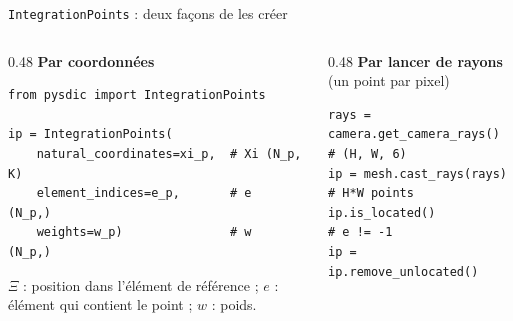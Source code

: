 \documentclass[aspectratio=169,11pt]{beamer}
\begin{document}
\begin{frame}[fragile]{\texttt{IntegrationPoints} : deux façons de les créer}
  \begin{columns}[T]
    \begin{column}{0.48\textwidth}
      \textbf{Par coordonnées}
\begin{lstlisting}
from pysdic import IntegrationPoints
 
ip = IntegrationPoints(
    natural_coordinates=xi_p,  # Xi (N_p, K)
    element_indices=e_p,       # e  (N_p,)
    weights=w_p)               # w  (N_p,)
\end{lstlisting}
      \scriptsize $\Xi$ : position dans l'élément de référence ; $e$ : élément qui
      contient le point ; $w$ : poids.
    \end{column}
    \begin{column}{0.48\textwidth}
      \textbf{Par lancer de rayons} \scriptsize(un point par pixel)
\begin{lstlisting}
rays = camera.get_camera_rays()  # (H, W, 6)
ip = mesh.cast_rays(rays)        # H*W points
ip.is_located()                  # e != -1
ip = ip.remove_unlocated()
\end{lstlisting}
    \end{column}
  \end{columns}
\end{frame}
 
\end{document}
